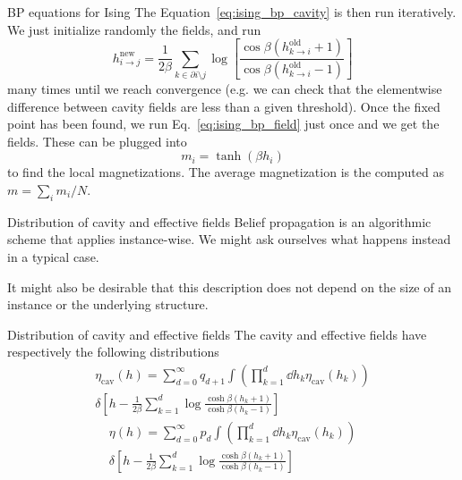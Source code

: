 \documentclass[handout]{beamer}
\begin{document}
\begin{frame}{BP equations for Ising}
    The Equation~\ref{eq:ising_bp_cavity} is then run iteratively. We just
    initialize randomly the fields, and run
    $$
    h_{i\to j}^{\text{new}} = \frac{1}{2\beta} \sum_{k\in \partial i \setminus
    j} \log \left[ \frac{\cos{\beta(h^{\text{old}}_{k\to i}
    +1)}}{\cos{\beta(h^{\text{old}}_{k\to i} -1)}} \right]
    $$
    many times until we reach convergence (e.g. we can check that the
    elementwise difference between cavity fields are less than a given
    threshold).
    Once the fixed point has been found, we run Eq.~\ref{eq:ising_bp_field} just
    once and we get the fields. These can be plugged into
    \begin{equation}
        m_i = \tanh(\beta h_i)
    \end{equation}
    to find the local magnetizations. The average magnetization is the computed
    as $m = \sum_i m_i / N$.
\end{frame}

\begin{frame}{Distribution of cavity and effective fields}
    Belief propagation is an algorithmic scheme that applies
    \alert{instance-wise}. We might ask ourselves what happens instead in a
    \alert{typical} case.

    It might also be desirable that this description does not depend on the size
    of an instance or the underlying structure.
\end{frame}

\begin{frame}{Distribution of cavity and effective fields}
    The cavity and effective fields have respectively the following
    distributions
    \begin{multline}
        \eta_{\text{cav}} (h) = \sum_{d=0}^{\infty} q_{d+1} \int \left(
        \prod_{k=1}^d \dd{h_k} \eta_{\text{cav}}(h_k) \right) \\ \delta \left[ h -
        \frac{1}{2\beta} \sum_{k=1}^d
    \log{\frac{\cosh{\beta(h_k+1)}}{\cosh{\beta(h_k-1)}}} \right]
    \label{eq:cav_field_distribution}
\end{multline}
\begin{multline}
        \eta(h) = \sum_{d=0}^{\infty} p_d \int \left(
        \prod_{k=1}^d \dd{h_k} \eta_{\text{cav}}(h_k) \right) \\ \delta \left[ h -
        \frac{1}{2\beta} \sum_{k=1}^d
    \log{\frac{\cosh{\beta(h_k+1)}}{\cosh{\beta(h_k-1)}}} \right]
    \label{eq:eff_field_distribution}
\end{multline}
\end{frame}
\end{document}

